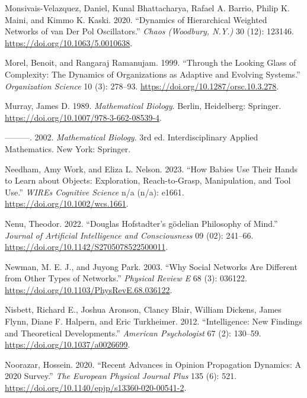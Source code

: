 \documentclass[
  a4paper,
  DIV=11,
  numbers=noendperiod,
  oneside]{scrreprt}
\newlength{\cslhangindent}
\newenvironment{CSLReferences}[2] %
 {\begin{list}{}{%
  \setlength{\itemindent}{0pt}
  \setlength{\leftmargin}{0pt}
  \setlength{\parsep}{0pt}
  \ifodd #1
   \setlength{\leftmargin}{\cslhangindent}
   \setlength{\itemindent}{-1\cslhangindent}
  \fi
  \setlength{\itemsep}{#2\baselineskip}}}
 {\end{list}}
\begin{document}
\begin{CSLReferences}{1}{0}
Monsivais-Velazquez, Daniel, Kunal Bhattacharya, Rafael A. Barrio,
Philip K. Maini, and Kimmo K. Kaski. 2020. {``Dynamics of Hierarchical
Weighted Networks of van Der {Pol} Oscillators.''} \emph{Chaos
(Woodbury, N.Y.)} 30 (12): 123146.
\url{https://doi.org/10.1063/5.0010638}.

Morel, Benoit, and Rangaraj Ramanujam. 1999. {``Through the {Looking
Glass} of {Complexity}: {The Dynamics} of {Organizations} as {Adaptive}
and {Evolving Systems}.''} \emph{Organization Science} 10 (3): 278--93.
\url{https://doi.org/10.1287/orsc.10.3.278}.

Murray, James D. 1989. \emph{Mathematical Biology}. Berlin, Heidelberg:
Springer. \url{https://doi.org/10.1007/978-3-662-08539-4}.

---------. 2002. \emph{Mathematical Biology}. 3rd ed. Interdisciplinary
Applied Mathematics. {New York}: {Springer}.

Needham, Amy Work, and Eliza L. Nelson. 2023. {``How Babies Use Their
Hands to Learn about Objects: {Exploration}, Reach-to-Grasp,
Manipulation, and Tool Use.''} \emph{WIREs Cognitive Science} n/a (n/a):
e1661. \url{https://doi.org/10.1002/wcs.1661}.

Nenu, Theodor. 2022. {``Douglas Hofstadter{'}s g{ö}delian Philosophy of
Mind.''} \emph{Journal of Artificial Intelligence and Consciousness} 09
(02): 241--66. \url{https://doi.org/10.1142/S2705078522500011}.

Newman, M. E. J., and Juyong Park. 2003. {``Why Social Networks Are
Different from Other Types of Networks.''} \emph{Physical Review E} 68
(3): 036122. \url{https://doi.org/10.1103/PhysRevE.68.036122}.

Nisbett, Richard E., Joshua Aronson, Clancy Blair, William Dickens,
James Flynn, Diane F. Halpern, and Eric Turkheimer. 2012.
{``Intelligence: New Findings and Theoretical Developments.''}
\emph{American Psychologist} 67 (2): 130--59.
\url{https://doi.org/10.1037/a0026699}.

Noorazar, Hossein. 2020. {``Recent Advances in Opinion Propagation
Dynamics: A 2020 Survey.''} \emph{The European Physical Journal Plus}
135 (6): 521. \url{https://doi.org/10.1140/epjp/s13360-020-00541-2}.


\end{CSLReferences}
\end{document}
